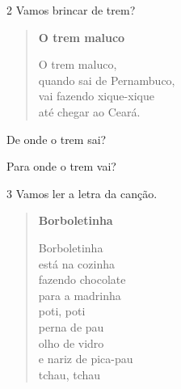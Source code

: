 \num{2} Vamos brincar de trem?


\begin{myquote}
\begin{verse}
\textbf{O trem maluco}

O trem maluco,\\
quando sai de Pernambuco,\\
vai fazendo xique-xique\\
até chegar ao Ceará.
\end{verse}
\end{myquote}

\begin{escolha}
\item De onde o trem sai?


\item Para onde o trem vai?

\end{escolha}

\num{3} Vamos ler a letra da canção.\enlargethispage{2\baselineskip}

\vspace{+1em}


\begin{myquote}
\begin{verse}
\textbf{Borboletinha}

Borboletinha\\
está na cozinha\\
fazendo chocolate\\
para a madrinha\\
poti, poti\\
perna de pau\\
olho de vidro\\
e nariz de pica-pau\\
tchau, tchau
\end{verse}

\end{myquote}

